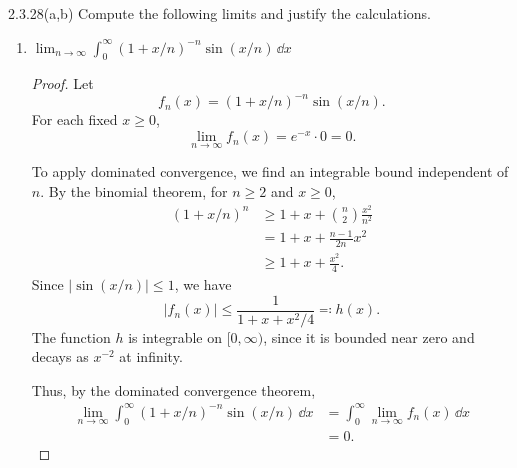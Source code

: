 \documentclass[11pt]{article}
\begin{document}
\begin{problem}{2.3.28(a,b)}
  Compute the following limits and justify the calculations.
  \begin{enumerate}[label=(\alph*)]
    \item \( \displaystyle\lim_{n\to\infty}
      \int_0^\infty(1+x/n)^{-n}\sin(x/n)\,\dd{x} \)

          \begin{proof}
            Let
            \begin{equation}
              \label{eq:p4-a-fn}
              f_n(x)=(1+x/n)^{-n}\sin(x/n).
            \end{equation}
            For each fixed \( x\geq 0 \),
            \begin{equation}
              \label{eq:p4-a-pointwise}
              \lim_{n\to\infty}f_n(x)
              =e^{-x}\cdot 0=0.
            \end{equation}

            To apply dominated convergence, we find an integrable bound independent of \( n \).
            By the binomial theorem, for \( n\geq 2 \) and \( x\geq 0 \),
            \begin{equation}
              \label{eq:p4-a-binomial}
              \begin{aligned}
                (1+x/n)^n
                &\geq 1+x+\binom{n}{2}\frac{x^2}{n^2}\\
                &=1+x+\frac{n-1}{2n}x^2\\
                &\geq 1+x+\frac{x^2}{4}.
              \end{aligned}
            \end{equation}
            Since \( |\sin(x/n)|\leq 1 \), we have
            \begin{equation}
              \label{eq:p4-a-domination}
              |f_n(x)|
              \leq \frac{1}{1+x+x^2/4}
              \eqqcolon h(x).
            \end{equation}
            The function \( h \) is integrable on \( [0,\infty) \), since it is bounded near zero and decays as \( x^{-2} \) at infinity.

            Thus, by the dominated convergence theorem,
            \begin{equation}
              \label{eq:p4-a-limit}
              \begin{aligned}
                \lim_{n\to\infty}
                \int_0^\infty(1+x/n)^{-n}\sin(x/n)\,\dd{x}
                &=\int_0^\infty\lim_{n\to\infty}f_n(x)\,\dd{x}\\
                &=0.
              \end{aligned}
            \end{equation}
          \end{proof}


\end{enumerate}
\end{problem}
\end{document}
